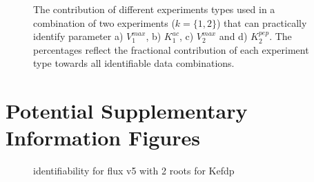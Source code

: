 \documentclass[10pt]{article}
\begin{document}
	\begin{figure}[!tbhp]
		\caption{The contribution of different experiments types used in a combination of two experiments ($k = \{1, 2\}$) that can practically identify parameter a) $V_1^{max}$, b) $K_1^{ac}$, c) $V_2^{max}$ and d) $K_2^{pep}$. The percentages reflect the fractional contribution of each experiment type towards all identifiable data combinations.}\label{fig:exp_info}
	\end{figure} 
	
	\clearpage

	\section{Potential Supplementary Information Figures}
	
	\begin{figure}[!tbhp]
		\caption{identifiability for flux v5 with 2 roots for Kefdp}
	\end{figure}
	
\end{document}
